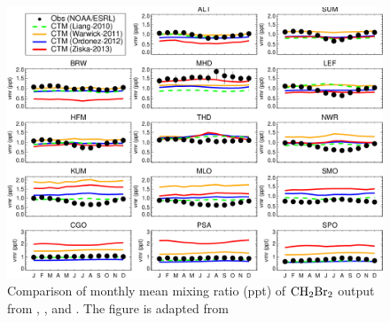 \begin{figure}[h]
    \centering
    \includegraphics[width =0.9\linewidth]{Appendix/images/Hossaini2013_fig6_ch2br2.png}
    \caption{Comparison of monthly mean mixing ratio (ppt) of $\mathrm{CH_2Br_2}$ output from \cite{Liang2010}, \cite{ziska}, \cite{Warwick2006} and \cite{Ordonez2012}. The figure is adapted from \cite{Hossaini2013}}
    \label{fig:Hosaini_fig6}
\end{figure}
